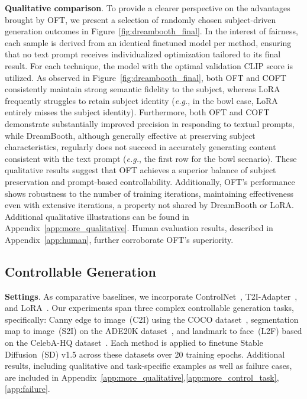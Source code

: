 \textbf{Qualitative comparison}. To provide a clearer perspective on the advantages brought by OFT, we present a selection of randomly chosen subject-driven generation outcomes in Figure~\ref{fig:dreambooth_final}. In the interest of fairness, each sample is derived from an identical finetuned model per method, ensuring that no text prompt receives individualized optimization tailored to its final result. For each technique, the model with the optimal validation CLIP score is utilized. As observed in Figure~\ref{fig:dreambooth_final}, both OFT and COFT consistently maintain strong semantic fidelity to the subject, whereas LoRA frequently struggles to retain subject identity (\emph{e.g.}, in the bowl case, LoRA entirely misses the subject identity). Furthermore, both OFT and COFT demonstrate substantially improved precision in responding to textual prompts, while DreamBooth, although generally effective at preserving subject characteristics, regularly does not succeed in accurately generating content consistent with the text prompt (\emph{e.g.}, the first row for the bowl scenario). These qualitative results suggest that OFT achieves a superior balance of subject preservation and prompt-based controllability. Additionally, OFT’s performance shows robustness to the number of training iterations, maintaining effectiveness even with extensive iterations, a property not shared by DreamBooth or LoRA. Additional qualitative illustrations can be found in Appendix~\ref{app:more_qualitative}. Human evaluation results, described in Appendix~\ref{app:human}, further corroborate OFT’s superiority.

\subsection{Controllable Generation}

\textbf{Settings}. As comparative baselines, we incorporate ControlNet~\cite{zhang2023adding}, T2I-Adapter~\cite{mou2023t2i}, and LoRA~\cite{hulora2022}. Our experiments span three complex controllable generation tasks, specifically: Canny edge to image~(C2I) using the COCO dataset~\cite{lin2014microsoft}, segmentation map to image~(S2I) on the ADE20K dataset~\cite{zhou2017scene}, and landmark to face~(L2F) based on the CelebA-HQ dataset~\cite{karras2018progressive,xia2021tedigan}. Each method is applied to finetune Stable Diffusion~(SD) v1.5 across these datasets over 20 training epochs. Additional results, including qualitative and task-specific examples as well as failure cases, are included in Appendix~\ref{app:more_qualitative},\ref{app:more_control_task},\ref{app:failure}.

